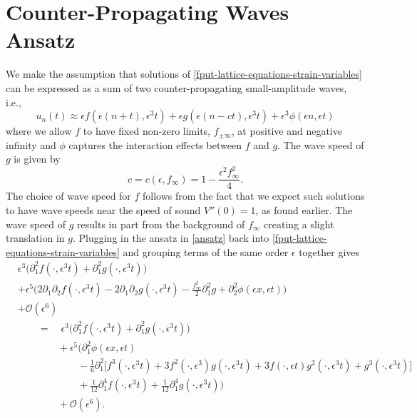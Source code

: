 
\section{Counter-Propagating Waves Ansatz}

We make the assumption that solutions of \cref{fput-lattice-equations-strain-variables} can be expressed as a sum of two counter-propagating small-amplitude waves, i.e., 
\begin{equation}\label{ansatz}
	u_n(t) \approx \epsilon f(\epsilon(n+t), \epsilon^3t) + \epsilon g(\epsilon(n-ct), \epsilon^3 t) + \epsilon^3\phi(\epsilon n, \epsilon t)
\end{equation}
where we allow \(f\) to have fixed non-zero limits, \(f_{\pm\infty}\), at positive and negative infinity and \(\phi\) captures the interaction effects between \(f\) and \(g\). The wave speed of \(g\) is given by
\begin{equation}\label{ansatz-wave-speed}
	c = c(\epsilon, f_\infty) = 1 - \frac{\epsilon^2 f_\infty^2}{4}.
\end{equation}
The choice of wave speed for \(f\) follows from the fact that we expect such solutions to have wave speeds near the speed of sound \(V''(0) = 1\), as found earlier. The wave speed of \(g\) results in part from the background of \(f_\infty\) creating a slight translation in \(g\). Plugging in the ansatz in \cref{ansatz} back into \cref{fput-lattice-equations-strain-variables} and grouping terms of the same order \(\epsilon\) together gives
\begin{equation*}
	\begin{aligned}
		&\epsilon^3 \Big(\partial_1^2 f(\cdot, \epsilon^3 t) + \partial_1^2 g(\cdot, \epsilon^3 t)\Big) \\
		&+ \epsilon^5 \Big( 2 \partial_1\partial_2 f(\cdot, \epsilon^3t) - 2 \partial_1\partial_2 g(\cdot, \epsilon^3 t) - \frac{f_\infty^2} 2 \partial_1^2 g + \partial_2^2 \phi(\epsilon x, \epsilon t)\Big) \\
		&+ \mathcal O(\epsilon^6)\\
		&\qquad = \quad \epsilon^3 \Big(\partial_1^2 f(\cdot, \epsilon^3 t) + \partial_1^2 g(\cdot, \epsilon^3 t)\Big) \\
		&\qquad\qquad + \epsilon^5\Big(\partial_1^2  \phi(\epsilon x, \epsilon t) \\
		&\qquad\qquad\qquad - \frac 1 6 \partial_1^2 \big[f^3(\cdot, \epsilon^3 t ) + 3 f^2(\cdot,\epsilon^3)g(\cdot, \epsilon^3t) + 3 f(\cdot, \epsilon t) g^2(\cdot,\epsilon^3 t) + g^3(\cdot, \epsilon^3 t)\big] \\
		&\qquad\qquad\qquad+ \frac 1 {12} \partial_1^4 f(\cdot, \epsilon^3 t) + \frac 1 {12} \partial_1^4 g(\cdot, \epsilon^3 t)\Big) \\
		&\qquad\qquad+ \mathcal O(\epsilon^6).
	\end{aligned}
\end{equation*}
